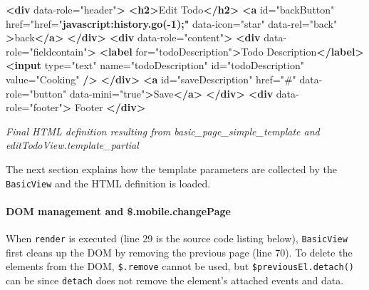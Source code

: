 \documentclass[9pt]{book}
\newenvironment{Shaded}{}{}
\newcommand{\KeywordTok}[1]{\textcolor[rgb]{0.00,0.44,0.13}{\textbf{{#1}}}}
\newcommand{\StringTok}[1]{\textcolor[rgb]{0.25,0.44,0.63}{{#1}}}
\newcommand{\OtherTok}[1]{\textcolor[rgb]{0.00,0.44,0.13}{{#1}}}
\newcommand{\ErrorTok}[1]{\textcolor[rgb]{1.00,0.00,0.00}{\textbf{{#1}}}}
\newcommand{\NormalTok}[1]{{#1}}
\begin{document}
\begin{Shaded}
\begin{Highlighting}[]
    \KeywordTok{<div}\OtherTok{ data-role=}\StringTok{"header"}\KeywordTok{>}
        \KeywordTok{<h2>}\NormalTok{Edit Todo}\KeywordTok{</h2>}
        \KeywordTok{<a}\OtherTok{ id=}\StringTok{"backButton"}\OtherTok{ href=}\StringTok{"href="}\ErrorTok{javascript:history.go(-1);"}\OtherTok{ data-icon=}\StringTok{"star"}\OtherTok{ data-rel=}\StringTok{"back"} \KeywordTok{>}\NormalTok{back}\KeywordTok{</a>}
    \KeywordTok{</div>}
    \KeywordTok{<div}\OtherTok{ data-role=}\StringTok{"content"}\KeywordTok{>}
      \KeywordTok{<div}\OtherTok{ data-role=}\StringTok{"fieldcontain"}\KeywordTok{>}
       \KeywordTok{<label}\OtherTok{ for=}\StringTok{"todoDescription"}\KeywordTok{>}\NormalTok{Todo Description}\KeywordTok{</label>}
       \KeywordTok{<input}\OtherTok{ type=}\StringTok{"text"}\OtherTok{ name=}\StringTok{"todoDescription"}\OtherTok{ id=}\StringTok{"todoDescription"}\OtherTok{ value=}\StringTok{"Cooking"} \KeywordTok{/>}
      \KeywordTok{</div>}
      \KeywordTok{<a}\OtherTok{ id=}\StringTok{"saveDescription"}\OtherTok{ href=}\StringTok{"#"}\OtherTok{ data-role=}\StringTok{"button"}\OtherTok{ data-mini=}\StringTok{"true"}\KeywordTok{>}\NormalTok{Save}\KeywordTok{</a>}
    \KeywordTok{</div>}
    \KeywordTok{<div}\OtherTok{ data-role=}\StringTok{"footer"}\KeywordTok{>}
        \NormalTok{Footer}
    \KeywordTok{</div>}
\end{Highlighting}
\end{Shaded}

\emph{Final HTML definition resulting from basic\_page\_simple\_template
and editTodoView.template\_partial}

The next section explains how the template parameters are collected by
the \texttt{BasicView} and the HTML definition is loaded.

\paragraph{DOM management and
\$.mobile.changePage}\label{dom-management-and-.mobile.changepage}

When \texttt{render} is executed (line 29 is the source code listing
below), \texttt{BasicView} first cleans up the DOM by removing the
previous page (line 70). To delete the elements from the DOM,
\texttt{\$.remove} cannot be used, but \texttt{\$previousEl.detach()}
can be since \texttt{detach} does not remove the element's attached
events and data.
\end{document}
